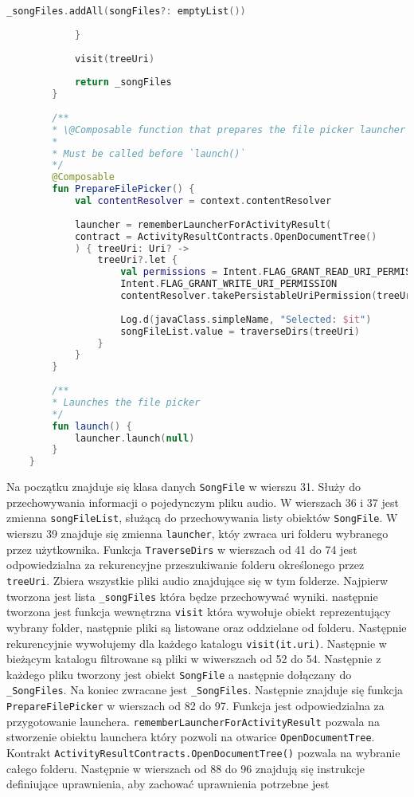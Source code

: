 \begin{lstlisting}[caption=Kod \texttt{MusicFileLoader}, label={lst:mfl-fullcode}, language=kotlin]
				_songFiles.addAll(songFiles?: emptyList())
				
			}
			
			visit(treeUri)
			
			return _songFiles
		}
		
		/**
		* \@Composable function that prepares the file picker launcher
		*
		* Must be called before `launch()`
		*/
		@Composable
		fun PrepareFilePicker() {
			val contentResolver = context.contentResolver
			
			launcher = rememberLauncherForActivityResult(
			contract = ActivityResultContracts.OpenDocumentTree()
			) { treeUri: Uri? ->
				treeUri?.let {
					val permissions = Intent.FLAG_GRANT_READ_URI_PERMISSION or
					Intent.FLAG_GRANT_WRITE_URI_PERMISSION
					contentResolver.takePersistableUriPermission(treeUri, permissions)
					
					Log.d(javaClass.simpleName, "Selected: $it")
					songFileList.value = traverseDirs(treeUri)
				}
			}
		}
		
		/**
		* Launches the file picker
		*/
		fun launch() {
			launcher.launch(null)
		}
	}
\end{lstlisting}
Na początku znajduje się klasa danych \texttt{SongFile} w wierszu 31. Służy do przechowywania informacji o pojedynczym pliku audio.
W wierszach 36 i 37 jest zmienna \texttt{songFileList}, służącą do przechowywania listy obiektów \texttt{SongFile}.
W wierszu 39 znajduje się zmienna \texttt{launcher}, któy zwraca uri folderu wybranego przez użytkownika.
Funkcja \texttt{TraverseDirs} w wierszach od 41 do 74 jest odpowiedzialna za rekurencyjne przeszukiwanie folderu określonego przez \texttt{treeUri}. Zbiera wszystkie pliki audio znajdujące się w tym folderze.
Najpierw tworzona jest lista \texttt{\_songFiles} która będze przechowywać wyniki. następnie tworzona jest funkcja wewnętrzna \texttt{visit} która wywołuje obiekt reprezentujący wybrany folder, następnie pliki są listowane oraz oddzielane od folderu. Następnie rekurencyjnie wywołujemy dla każdego katalogu \texttt{visit(it.uri)}. Następnie w bieżącym katalogu filtrowane są pliki w wiwerszach od 52 do 54. Następnie z każdego pliku tworzony jest obiekt \texttt{SongFile} a następnie dołączany do \texttt{\_SongFiles}.
Na koniec zwracane jest \texttt{\_SongFiles}.
Następnie znajduje się funkcja \texttt{PrepareFilePicker} w wierszach od 82 do 97. Funkcja jest odpowiedzialna za przygotowanie launchera.
\texttt{rememberLauncherForActivityResult} 
pozwala na stworzenie obiektu launchera który pozwoli na otwarice \texttt{OpenDocumentTree}.
Kontrakt \texttt{ActivityResultContracts.OpenDocumentTree()} pozwala na wybranie całego folderu. Następnie w wierszach od 88 do 96 znajdują się instrukcje definiujące uprawnienia, aby zachować uprawnienia potrzebne jest

